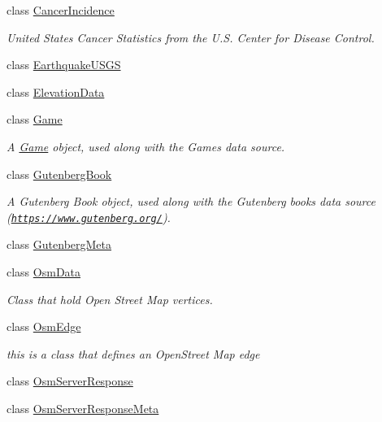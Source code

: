 \begin{DoxyCompactItemize}
class \hyperlink{classbridges_1_1data__src__dependent_1_1_cancer_incidence}{Cancer\+Incidence}
\begin{DoxyCompactList}\small\item\em United States Cancer Statistics from the U.\+S. Center for Disease Control. \end{DoxyCompactList}\item 
class \hyperlink{classbridges_1_1data__src__dependent_1_1_earthquake_u_s_g_s}{Earthquake\+U\+S\+GS}
\item 
class \hyperlink{classbridges_1_1data__src__dependent_1_1_elevation_data}{Elevation\+Data}
\item 
class \hyperlink{classbridges_1_1data__src__dependent_1_1_game}{Game}
\begin{DoxyCompactList}\small\item\em A \hyperlink{classbridges_1_1data__src__dependent_1_1_game}{Game} object, used along with the Games data source. \end{DoxyCompactList}\item 
class \hyperlink{classbridges_1_1data__src__dependent_1_1_gutenberg_book}{Gutenberg\+Book}
\begin{DoxyCompactList}\small\item\em A Gutenberg Book object, used along with the Gutenberg books data source (\href{https://www.gutenberg.org/}{\tt https\+://www.\+gutenberg.\+org/}). \end{DoxyCompactList}\item 
class \hyperlink{classbridges_1_1data__src__dependent_1_1_gutenberg_meta}{Gutenberg\+Meta}
\item 
class \hyperlink{classbridges_1_1data__src__dependent_1_1_osm_data}{Osm\+Data}
\begin{DoxyCompactList}\small\item\em Class that hold Open Street Map vertices. \end{DoxyCompactList}\item 
class \hyperlink{classbridges_1_1data__src__dependent_1_1_osm_edge}{Osm\+Edge}
\begin{DoxyCompactList}\small\item\em this is a class that defines an Open\+Street Map edge \end{DoxyCompactList}\item 
class \hyperlink{classbridges_1_1data__src__dependent_1_1_osm_server_response}{Osm\+Server\+Response}
\item 
class \hyperlink{classbridges_1_1data__src__dependent_1_1_osm_server_response_meta}{Osm\+Server\+Response\+Meta}

\end{DoxyCompactItemize}
